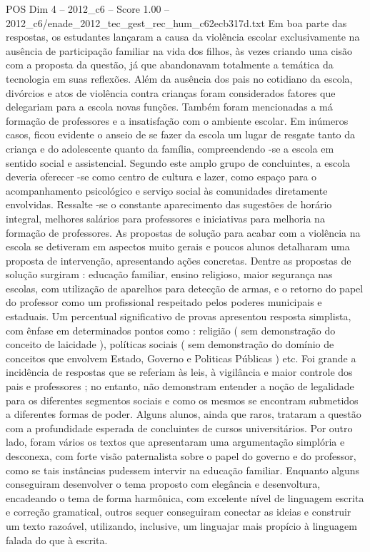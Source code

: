 \begin{textsample}{POS Dim 4 – 2012\_c6 – Score 1.00 – 2012\_c6/enade\_2012\_tec\_gest\_rec\_hum\_c62ecb317d.txt}
Em boa parte das respostas, os estudantes lançaram a causa da violência escolar exclusivamente na ausência de participação familiar na vida dos filhos, às vezes criando uma cisão com a proposta da questão, já que abandonavam totalmente a temática da tecnologia em suas reflexões.
Além da ausência dos pais no cotidiano da escola, divórcios e atos de violência contra crianças foram considerados fatores que delegariam para a escola novas funções.
Também foram mencionadas a má formação de professores e a insatisfação com o ambiente escolar.
Em inúmeros casos, ficou evidente o anseio de se fazer da escola um lugar de resgate tanto da criança e do adolescente quanto da família, compreendendo -se a escola em sentido social e assistencial.
Segundo este amplo grupo de concluintes, a escola deveria oferecer -se como centro de cultura e lazer, como espaço para o acompanhamento psicológico e serviço social às comunidades diretamente envolvidas.
Ressalte -se o constante aparecimento das sugestões de horário integral, melhores salários para professores e iniciativas para melhoria na formação de professores.
As propostas de solução para acabar com a violência na escola se detiveram em aspectos muito gerais e poucos alunos detalharam uma proposta de intervenção, apresentando ações concretas.
Dentre as propostas de solução surgiram : educação familiar, ensino religioso, maior segurança nas escolas, com utilização de aparelhos para detecção de armas, e o retorno do papel do professor como um profissional respeitado pelos poderes municipais e estaduais.
Um percentual significativo de provas apresentou resposta simplista, com ênfase em determinados pontos como : religião ( sem demonstração do conceito de laicidade ), políticas sociais ( sem demonstração do domínio de conceitos que envolvem Estado, Governo e Politicas Públicas ) etc.
Foi grande a incidência de respostas que se referiam às leis, à vigilância e maior controle dos pais e professores ; no entanto, não demonstram entender a noção de legalidade para os diferentes segmentos sociais e como os mesmos se encontram submetidos a diferentes formas de poder.
Alguns alunos, ainda que raros, trataram a questão com a profundidade esperada de concluintes de cursos universitários.
Por outro lado, foram vários os textos que apresentaram uma argumentação simplória e desconexa, com forte visão paternalista sobre o papel do governo e do professor, como se tais instâncias pudessem intervir na educação familiar.
Enquanto alguns conseguiram desenvolver o tema proposto com elegância e desenvoltura, encadeando o tema de forma harmônica, com excelente nível de linguagem escrita e correção gramatical, outros sequer conseguiram conectar as ideias e construir um texto razoável, utilizando, inclusive, um linguajar mais propício à linguagem falada do que à escrita.

\end{textsample}
